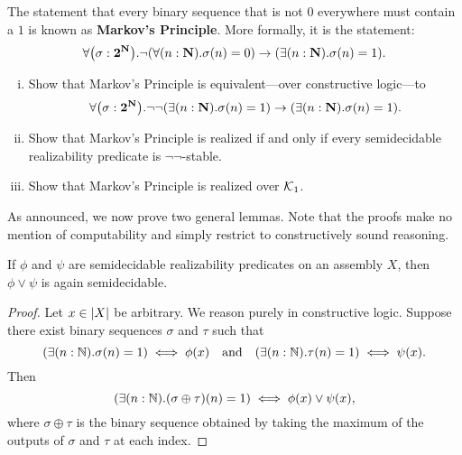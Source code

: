 \begin{definition}
  The statement that every binary sequence that is not \(0\) everywhere must
  contain a \(1\) is known as \textbf{Markov's Principle}.
  More formally, it is the statement:
  \[
    \forall\pa[\big]{\sigma:\Two^\NatAsm}.  \lnot(\forall(n : \NatAsm).\sigma(n)
    = 0) \to (\exists(n : \NatAsm).\sigma(n) = 1).
  \]
\end{definition}

\begin{exercise}\label{exer:Markov's-Principle}\leavevmode
  \begin{enumerate}[(i)]
  \item Show that Markov's Principle is equivalent---over constructive logic---to
    \[
      \forall\pa[\big]{\sigma:\Two^\NatAsm}.  \lnot\lnot(\exists(n :
      \NatAsm).\sigma(n) = 1) \to (\exists(n : \NatAsm).\sigma(n) = 1).
    \]
  \item Show that Markov's Principle is realized if and only if every
    semidecidable realizability predicate is \(\lnot\lnot\)-stable.
  \item Show that Markov's Principle is realized over \(\Kone\).
  \end{enumerate}
\end{exercise}

As announced, we now prove two general lemmas. Note that the proofs make no
mention of computability and simply restrict to constructively sound reasoning.

\begin{lemma}\label{semidecidable-closed-under-or}
  If \(\phi\) and \(\psi\) are semidecidable realizability predicates on an
  assembly \(X\), then \(\phi \lor \psi\) is again semidecidable.
\end{lemma}
\begin{proof}
  Let \(x \in \carrier{X}\) be arbitrary.
  We reason purely in constructive logic.
  Suppose there exist binary sequences \(\sigma\) and \(\tau\) such that
  \[
    (\exists(n:\Nat).\sigma(n) = 1) \iff \phi(x)
    \quad\text{and}\quad
    (\exists(n:\Nat).\tau(n) = 1) \iff \psi(x).
  \]
  Then
  \[
    (\exists(n:\Nat).(\sigma\oplus\tau)(n) = 1) \iff \phi(x) \lor \psi(x),
  \]
  where \(\sigma\oplus\tau\) is the binary sequence obtained by taking the
  maximum of the outputs of \(\sigma\) and \(\tau\) at each index.
\end{proof}

